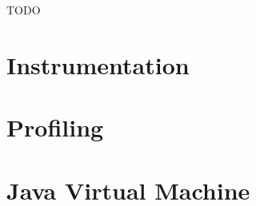 
TODO

\section{Instrumentation}


\section{Profiling}





\iffalse
Profilers typically need to sample the call stack of a thread every few milliseconds. A common way to achieve this on Unix-like systems is to have an application-wide timer that notifices its expiration through a signal. The \code{SIGPROF}) signal and \code{ITIMER_PROF} timer is typically used for this purposes. Once the signal is received, the call stack is sampled, by walking on the stack of the running thread.

Since the timer is application-wide, it expires when the total CPU time consumed by threads exceeds the timer value. The signal is then received at the thread that caused the timer to expire. As such, threads that consume more CPU time are more prone to receive the profiling signal than other threads, which is aligned with the profiler's idea of sampling the CPU hungry parts of the application.
\fi


\section{Java Virtual Machine}



